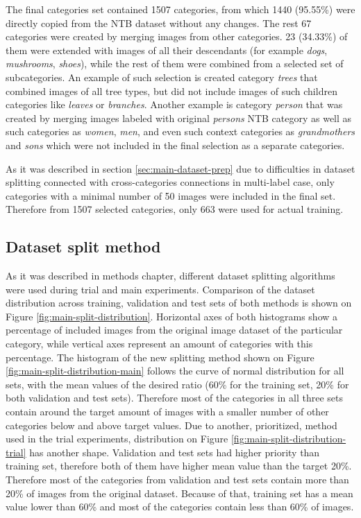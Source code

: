     The final categories set contained 1507 categories, from which 1440 (95.55\%) were directly copied from the NTB dataset without any changes. The rest 67 categories were created by merging images from other categories. 23 (34.33\%) of them were extended with images of all their descendants (for example \textit{dogs}, \textit{mushrooms}, \textit{shoes}), while the rest of them were combined from a selected set of subcategories. An example of such selection is created category \textit{trees} that combined images of all tree types, but did not include images of such children categories like \textit{leaves} or \textit{branches}. Another example is category \textit{person} that was created by merging images labeled with original \textit{persons} NTB category as well as such categories as \textit{women}, \textit{men}, and even such context categories as \textit{grandmothers} and \textit{sons} which were not included in the final selection as a separate categories.
    
    As it was described in section \ref{sec:main-dataset-prep} due to difficulties in dataset splitting connected with cross-categories connections in multi-label case, only categories with a minimal number of 50 images were included in the final set. Therefore from 1507 selected categories, only 663 were used for actual training.

\subsection{Dataset split method}
    \label{sec:split-comparison}
    As it was described in methods chapter, different dataset splitting algorithms were used during trial and main experiments. Comparison of the dataset distribution across training, validation and test sets of both methods is shown on Figure \ref{fig:main-split-distribution}. Horizontal axes of both histograms show a percentage of included images from the original image dataset of the particular category, while vertical axes represent an amount of categories with this percentage. The histogram of the new splitting method shown on Figure \ref{fig:main-split-distribution-main} follows the curve of normal distribution for all sets, with the mean values of the desired ratio (60\% for the training set, 20\% for both validation and test sets). Therefore most of the categories in all three sets contain around the target amount of images with a smaller number of other categories below and above target values. Due to another, prioritized, method used in the trial experiments, distribution on Figure \ref{fig:main-split-distribution-trial} has another shape. Validation and test sets had higher priority than training set, therefore both of them have higher mean value than the target 20\%. Therefore most of the categories from validation and test sets contain more than 20\% of images from the original dataset. Because of that, training set has a mean value lower than 60\% and most of the categories contain less than 60\% of images.
    
